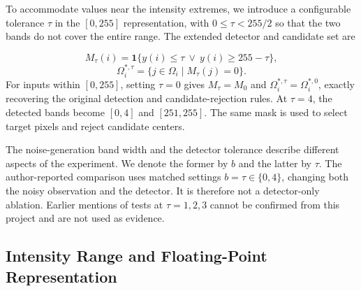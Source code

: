 \documentclass[pdflatex,iicol,sn-mathphys-num]{sn-jnl}
\newif\ifshowportuguese
\newcommand{\pt}[1]{\ifshowportuguese\par\begingroup\small\color{blue!55!black}\noindent\textbf{PT: }#1\par\endgroup\fi}
\begin{document}
To accommodate values near the intensity extremes, we introduce a configurable tolerance $\tau$ in the $[0,255]$ representation, with $0\leq\tau<255/2$ so that the two bands do not cover the entire range. The extended detector and candidate set are
\pt{Para contemplar valores próximos dos extremos de intensidade, introduzimos uma tolerância configurável $\tau$ na representação $[0,255]$, com $0\leq\tau<255/2$ para que as duas faixas não cubram toda a escala. O detector estendido e o conjunto de candidatos são}
\begin{equation}
M_\tau(i)=\mathbf{1}\{y(i)\leq\tau\ \lor\ y(i)\geq255-\tau\},
\label{eq:tolerant_impulse_mask}
\end{equation}
\begin{equation}
\Omega_i^{*,\tau}=\{j\in\Omega_i\mid M_\tau(j)=0\}.
\label{eq:tolerant_valid_candidates}
\end{equation}
For inputs within $[0,255]$, setting $\tau=0$ gives $M_\tau=M_0$ and $\Omega_i^{*,\tau}=\Omega_i^{*,0}$, exactly recovering the original detection and candidate-rejection rules. At $\tau=4$, the detected bands become $[0,4]$ and $[251,255]$. The same mask is used to select target pixels and reject candidate centers.
\pt{Para entradas em $[0,255]$, definir $\tau=0$ fornece $M_\tau=M_0$ e $\Omega_i^{*,\tau}=\Omega_i^{*,0}$, recuperando exatamente as regras originais de detecção e rejeição de candidatos. Em $\tau=4$, as faixas detectadas passam a ser $[0,4]$ e $[251,255]$. A mesma máscara é usada para selecionar os pixels alvo e rejeitar centros de candidatos.}

The noise-generation band width and the detector tolerance describe different aspects of the experiment. We denote the former by $b$ and the latter by $\tau$. The author-reported comparison uses matched settings $b=\tau\in\{0,4\}$, changing both the noisy observation and the detector. It is therefore not a detector-only ablation. Earlier mentions of tests at $\tau=1,2,3$ cannot be confirmed from this project and are not used as evidence.
\pt{A largura da faixa de geração do ruído e a tolerância do detector descrevem aspectos diferentes do experimento. Denotamos a primeira por $b$ e a segunda por $\tau$. A comparação informada pelo autor usa configurações correspondentes $b=\tau\in\{0,4\}$, alterando tanto a observação ruidosa quanto o detector. Portanto, não é uma ablação apenas do detector. Menções anteriores a testes em $\tau=1,2,3$ não podem ser confirmadas neste projeto e não são usadas como evidência.}

\subsection{Intensity Range and Floating-Point Representation}
\label{subsec:intensity_representation}
\end{document}
